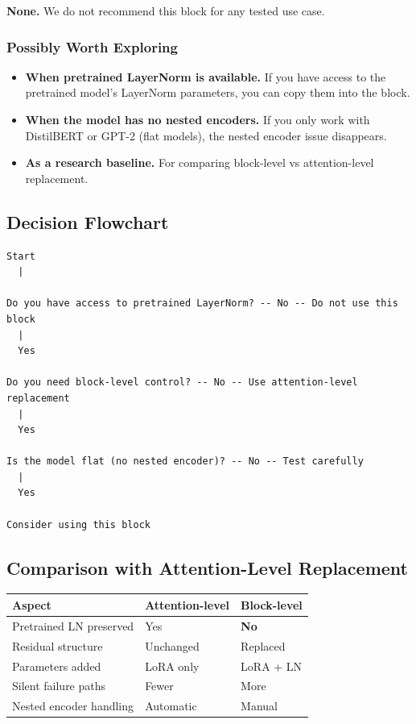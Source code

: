 \textbf{None.} We do not recommend this block for any tested use case.

\subsubsection{Possibly Worth Exploring}

\begin{itemize}
\item \textbf{When pretrained LayerNorm is available.} If you have access to the
  pretrained model's LayerNorm parameters, you can copy them into the block.
\item \textbf{When the model has no nested encoders.} If you only work with DistilBERT
  or GPT-2 (flat models), the nested encoder issue disappears.
\item \textbf{As a research baseline.} For comparing block-level vs attention-level
  replacement.

\end{itemize}
\subsection{Decision Flowchart}

\begin{lstlisting}
Start
  |
   
Do you have access to pretrained LayerNorm? -- No -- Do not use this block
  |
  Yes
   
Do you need block-level control? -- No -- Use attention-level replacement
  |
  Yes
   
Is the model flat (no nested encoder)? -- No -- Test carefully
  |
  Yes
   
Consider using this block
\end{lstlisting}

\subsection{Comparison with Attention-Level Replacement}

\begin{table}[H]
\centering
\small
\begin{tabular}{lll}
\toprule
\textbf{Aspect} & \textbf{Attention-level} & \textbf{Block-level} \\
\midrule
Pretrained LN preserved & Yes & \textbf{No} \\
Residual structure & Unchanged & Replaced \\
Parameters added & LoRA only & LoRA + LN \\
Silent failure paths & Fewer & More \\
Nested encoder handling & Automatic & Manual \\
\bottomrule
\end{tabular}
\end{table}

